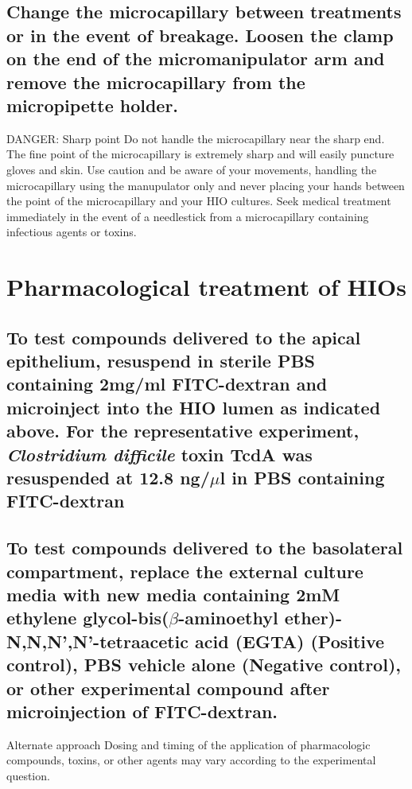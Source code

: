 \documentclass[11pt]{article}
\newcommand\dangersign[1][4ex]{\renewcommand\stacktype{L}\scaleto{\stackon[1pt]{\color{red}$\triangle$}{\tiny !}}{#1}}
\begin{document}
\subsection{{\sffamily } Change the microcapillary between treatments or in the event of breakage. Loosen the clamp on the end of the micromanipulator arm and remove the microcapillary from the micropipette holder.}
\label{sec:orgheadline55}
\begin{bclogo}[logo=\dangersign, couleurBarre=red, noborder=true, couleur=yellow!20]{     DANGER: Sharp point}
Do not handle the microcapillary near the sharp end. The fine point of the microcapillary is extremely sharp and will easily puncture gloves and skin. Use caution and be aware of your movements, handling the microcapillary using the manupulator only and never placing your hands between the point of the microcapillary and your HIO cultures. Seek medical treatment immediately in the event of a needlestick from a microcapillary containing infectious agents or toxins.\\
\end{bclogo}

\section{{\sffamily } Pharmacological treatment of HIOs}
\label{sec:orgheadline59}
\subsection{{\sffamily } To test compounds delivered to the apical epithelium, resuspend in sterile PBS containing 2mg/ml FITC-dextran and microinject into the HIO lumen as indicated above. For the representative experiment, \emph{Clostridium difficile} toxin TcdA was resuspended at 12.8 ng/\(\mu\)l in PBS containing FITC-dextran}
\label{sec:orgheadline57}
\subsection{{\sffamily } To test compounds delivered to the basolateral compartment, replace the external culture media with new media containing 2mM ethylene glycol-bis(\(\beta\)-aminoethyl ether)-N,N,N',N'-tetraacetic acid (EGTA) (Positive control), PBS vehicle alone (Negative control), or other experimental compound after microinjection of FITC-dextran.}
\label{sec:orgheadline58}

\begin{bclogo}[logo=\bcinfo, couleurBarre=Black, noborder=true, couleur=gray!10]{     Alternate approach}
Dosing and timing of the application of pharmacologic compounds, toxins, or other agents may vary according to the experimental question.\\
\end{bclogo}
\end{document}
